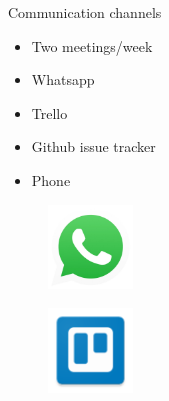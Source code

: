 \begin{frame}{Communication channels}
	\begin{itemize}
		\item Two meetings/week
		\item Whatsapp
		\item Trello
		\item Github issue tracker
		\item Phone
	\end{itemize}

	\begin{figure}[htbp]
  		\centering
  		\includegraphics[width=0.2\textwidth]{figures/whatsapp}
	\end{figure}
	\begin{figure}[htbp]
  		\centering
  		\includegraphics[width=0.2\textwidth]{figures/trello}
	\end{figure}
\end{frame}